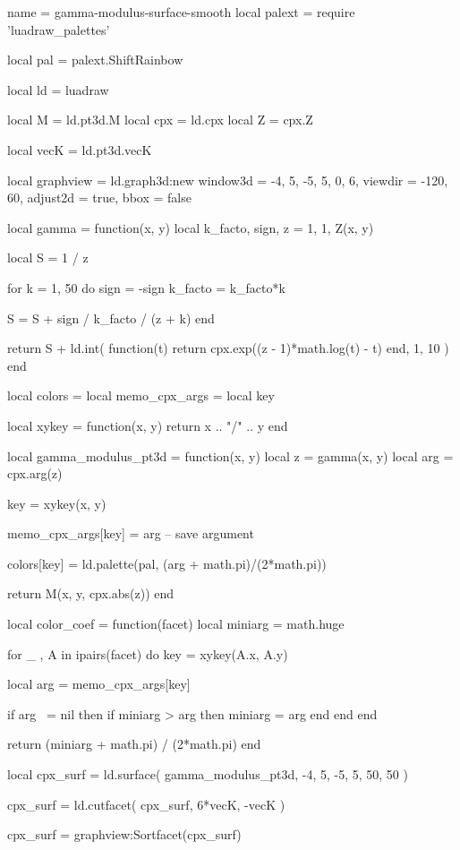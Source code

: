 \documentclass[border = 3pt]{standalone}
\begin{document}
\begin{luadraw*}{name = gamma-modulus-surface-smooth}
local palext = require 'luadraw_palettes'

local pal = palext.ShiftRainbow

local ld = luadraw

local M   = ld.pt3d.M
local cpx = ld.cpx
local Z   = cpx.Z

local vecK = ld.pt3d.vecK

local graphview = ld.graph3d:new{
  window3d = {-4, 5, -5, 5, 0, 6},
  viewdir  = {-120, 60},
  adjust2d = true,
  bbox     = false
}

local gamma = function(x, y)
  local k_facto, sign, z = 1, 1, Z(x, y)

  local S = 1 / z

  for k = 1, 50 do
    sign    = -sign
    k_facto = k_facto*k

    S = S + sign / k_facto / (z + k)
  end

  return S + ld.int(
    function(t)
      return cpx.exp((z - 1)*math.log(t) - t)
    end,
    1, 10
  )
end

local colors        = {}
local memo_cpx_args = {}
local key

local xykey = function(x, y)
  return x .. "/" .. y
end

local gamma_modulus_pt3d = function(x, y)
  local z = gamma(x, y)
  local arg = cpx.arg(z)

  key = xykey(x, y)

  memo_cpx_args[key] = arg -- save argument

  colors[key] = ld.palette(pal, (arg + math.pi)/(2*math.pi))

  return M(x, y, cpx.abs(z))
end

local color_coef = function(facet)
  local miniarg = math.huge

  for _ , A in ipairs(facet) do
    key = xykey(A.x, A.y)

    local arg = memo_cpx_args[key]

    if arg ~= nil then
      if miniarg > arg then
        miniarg = arg
      end
    end
  end

  return (miniarg + math.pi) / (2*math.pi)
end

local cpx_surf = ld.surface(
  gamma_modulus_pt3d,
  -4, 5, -5, 5,
  {50, 50}
)

cpx_surf = ld.cutfacet(
  cpx_surf,
  {6*vecK, -vecK}
)

cpx_surf = graphview:Sortfacet(cpx_surf)


\end{luadraw*}
\end{document}
